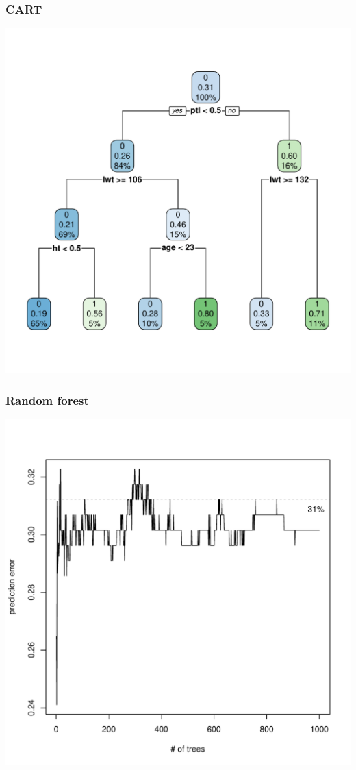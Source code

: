 \begin{frame}[fragile]\frametitle{CART}

\centering
\includegraphics[scale=.45]{images/Figure_3}

\end{frame}
\begin{frame}[fragile]\frametitle{Random forest}

\centering
\includegraphics[scale=.45]{images/Figure_4}

\end{frame}
